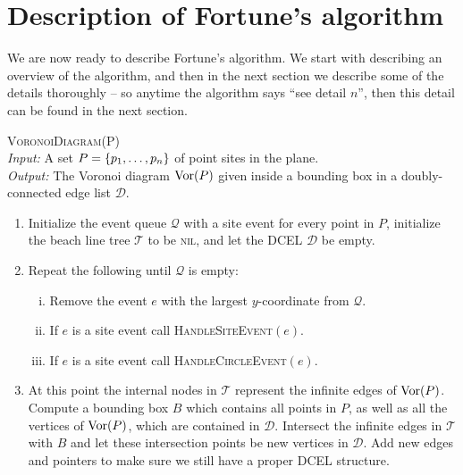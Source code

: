 \chapter{Description of Fortune's algorithm}

We are now ready to describe Fortune's algorithm. We start with describing an overview of the algorithm, and then in the next section we describe some of the details thoroughly -- so anytime the algorithm says ``see detail $n$'', then this detail can be found in the next section.

\begin{alg} \label{alg:fortune} \textsc{VoronoiDiagram}(P) \\
\textit{Input:} A set $P = \{p_1, \ldots, p_n\}$ of point sites in the plane. \\
\textit{Output:} The Voronoi diagram $\operatorname{Vor}(P)$ given inside a bounding box in a doubly-connected edge list $\mathcal{D}$.
\begin{enumerate}
    \item Initialize the event queue $\mathcal{Q}$ with a site event for every point in $P$, initialize the beach line tree $\mathcal{T}$ to be \textsc{nil}, and let the DCEL $\mathcal{D}$ be empty.
    \item Repeat the following until $\mathcal{Q}$ is empty:
    \begin{enumerate}[i.]
        \item Remove the event $e$ with the largest $y$-coordinate from $\mathcal{Q}$.
        \item If $e$ is a site event call \textsc{HandleSiteEvent}$(e)$.
        \item If $e$ is a site event call \textsc{HandleCircleEvent}$(e)$.
    \end{enumerate}
    \item At this point the internal nodes in $\mathcal{T}$ represent the infinite edges of $\operatorname{Vor}(P)$. Compute a bounding box $B$ which contains all points in $P$, as well as all the vertices of $\operatorname{Vor}(P)$, which are contained in $\mathcal{D}$. Intersect the infinite edges in $\mathcal{T}$ with $B$ and let these intersection points be new vertices in $\mathcal{D}$. Add new edges and pointers to make sure we still have a proper DCEL structure.
\end{enumerate}
\end{alg}

